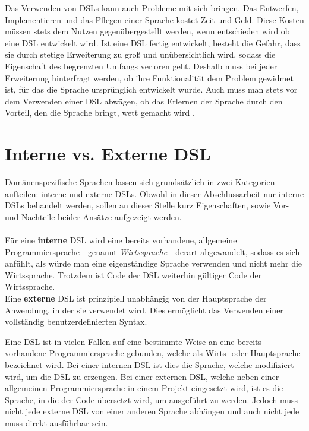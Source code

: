 Das Verwenden von DSLs kann auch Probleme mit sich bringen. Das Entwerfen, Implementieren und das Pflegen einer Sprache kostet Zeit und Geld. Diese Kosten müssen stets dem Nutzen gegenübergestellt werden, wenn entschieden wird ob eine DSL entwickelt wird. Ist eine DSL fertig entwickelt, besteht die Gefahr, dass sie durch stetige Erweiterung zu groß und unübersichtlich wird, sodass die Eigenschaft des begrenzten Umfangs verloren geht. Deshalb muss bei jeder Erweiterung hinterfragt werden, ob ihre Funktionalität dem Problem gewidmet ist, für das die Sprache ursprünglich entwickelt wurde. Auch muss man stets vor dem Verwenden einer DSL abwägen, ob das Erlernen der Sprache durch den Vorteil, den die Sprache bringt, wett gemacht wird \cite{www:fowlerWorkbench}.

\section{Interne vs. Externe DSL}\label{sct:2.2:intvsext}
Domänenspezifische Sprachen lassen sich grundsätzlich in zwei Kategorien aufteilen: interne und externe DSLs. Obwohl in dieser Abschlussarbeit nur interne DSLs behandelt werden, sollen an dieser Stelle kurz Eigenschaften, sowie Vor- und Nachteile beider Ansätze aufgezeigt werden.
\\ \\ %
Für eine \textbf{interne} DSL wird eine bereits vorhandene, allgemeine Programmiersprache - genannt \emph{Wirtssprache} - derart abgewandelt, sodass es sich anfühlt, als würde man eine eigenständige Sprache verwenden und nicht mehr die Wirtssprache. Trotzdem ist Code der DSL weiterhin gültiger Code der Wirtssprache.\\
Eine \textbf{externe} DSL ist prinzipiell unabhängig von der Hauptsprache der Anwendung, in der sie verwendet wird. Dies ermöglicht das Verwenden einer vollständig benutzerdefinierten Syntax.

Eine DSL ist in vielen Fällen auf eine bestimmte Weise an eine bereits vorhandene Programmiersprache gebunden, welche als Wirts- oder Hauptsprache bezeichnet wird. Bei einer internen DSL ist dies die Sprache, welche modifiziert wird, um die DSL zu erzeugen. Bei einer externen DSL, welche neben einer allgemeinen Programmiersprache in einem Projekt eingesetzt wird, ist es die Sprache, in die der Code übersetzt wird, um ausgeführt zu werden.
Jedoch muss nicht jede externe DSL von einer anderen Sprache abhängen und auch nicht jede muss direkt ausführbar sein\cite{paper:Mernik}.
\\ \\ %

